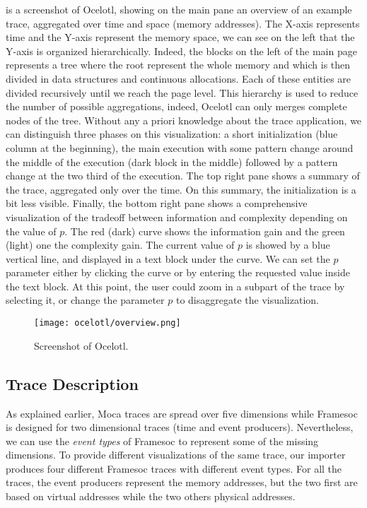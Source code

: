 is a screenshot of \gls{Ocelotl}, showing on the main pane an overview of an example trace, aggregated over time and space (memory addresses).
The X-axis represents time and the Y-axis represent the memory space, we can see on the left that the Y-axis is organized hierarchically.
Indeed, the blocks on the left of the main page represents a tree where the root represent the whole memory and which is then divided in data structures and continuous allocations.
Each of these entities are divided recursively until we reach the page level.
This hierarchy is used to reduce the number of possible aggregations, indeed, \gls{Ocelotl} can only merges complete nodes of the tree.
Without any a priori knowledge about the trace application, we can distinguish three phases on this visualization: a short initialization (blue column at the beginning), the main execution with some pattern change around the middle of the execution (dark block in the middle) followed by a pattern change at the two third of the execution.
The top right pane shows a summary of the trace, aggregated only over the time.
On this summary, the initialization is a bit less visible.
Finally, the bottom right pane shows a comprehensive visualization of the tradeoff between information and complexity depending on the value of $p$.
The red (dark) curve shows the information gain and the green (light) one the complexity gain.
The current value of $p$ is showed by a blue vertical line, and displayed in a text block under the curve.
We can set the $p$ parameter either by clicking the curve or by entering the requested value inside the text block.
At this point, the user could zoom in a subpart of the trace by selecting it, or change the parameter $p$ to disaggregate the visualization.

\begin{figure}[htb]
    \centering
    \texttt{[image: ocelotl/overview.png]}
    \caption{Screenshot of Ocelotl.}
    \label{fig:ocelotl-overview}
\end{figure}

\subsection{Trace Description}

As explained earlier, \gls{Moca} traces are spread over five dimensions while \gls{Framesoc} is designed for two dimensional traces (time and event producers).
Nevertheless, we can use the \emph{event types} of \gls{Framesoc} to represent some of the missing dimensions.
To provide different visualizations of the same trace, our importer produces four different \gls{Framesoc} traces with different event types.
For all the traces, the event producers represent the memory addresses, but the two first are based on virtual addresses while the two others physical addresses.

